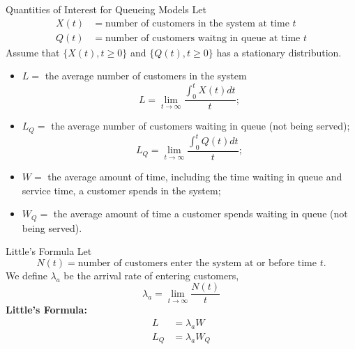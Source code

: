 \documentclass[letterpaper,handout, mathserif]{beamer}
\begin{document}
\begin{frame}{Quantities of Interest for Queueing Models}
Let
\begin{align*}
X(t) &= \mbox{number of customers in the system at time }t\\
Q(t) &= \mbox{number of customers waitng in queue at time }t
\end{align*}
Assume that $\{X(t), t \ge 0\}$ and $\{Q(t), t \ge 0\}$ has a stationary distribution.
\begin{itemize}
\item $L=$ the average number of customers in the system
$$L=\lim_{t\to\infty}\frac{\int_0^t X(t)dt}{t};$$
\item $L_Q=$ the average number of customers waiting in queue (not being served);
$$L_Q=\lim_{t\to\infty}\frac{\int_0^t Q(t)dt}{t};$$
\item $W=$ the average amount of time, including the time waiting in queue and service time, a customer spends in the system;
\item $W_Q=$ the average amount of time a customer spends waiting in queue (not being served).
\end{itemize}
\end{frame}
\begin{frame}{Little's Formula}
Let
$$N(t) = \mbox{number of customers enter the system at or before time }t.$$
We define $\lambda_a$ be the arrival rate of entering customers,
$$
\lambda_a=\lim_{t\to\infty}\frac{N(t)}{t}
$$
\textbf{Little's Formula:}
\begin{align*}
L &=\lambda_a W\\
L_Q &=\lambda_a W_Q
\end{align*}
\end{frame}
\end{document}
